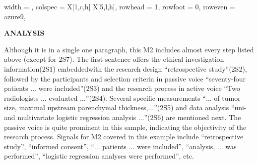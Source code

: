 \documentclass{ctexbook}
\begin{document}
\begin{sample}[label={myautocounter}]{\heiti}
{\begin{longtblr}[
      caption = {Common Prefixes},
      label = {tab:Common_Prefixes},
  ]{
      width = \textwidth,
      colspec = {X[1,c,h]  X[5,l,h]},
      rowhead = 1, rowfoot = 0, %
      row{even} = {azure9},
  }
    \bottomrule

  \end{longtblr}
  }

  \noindent \textbf{ANALYSIS}

  Although it is in a single one paragraph, this M2 includes almost every step listed above (except for 2S7). The first sentence offers the ethical investigation information(2S1) embeddedwith the research design ``retrospective study''(2S2), followed by the participants and selection criteria in passive voice ``seventy-four patients $\dots$ were included''(2S3) and the research process in active voice ``Two radiologists $\dots$ evaluated $\dots$''(2S4). Several specific measurements ``$\dots$ of tumor size, maximal upstream parenchymal thickness,$\dots$''(2S5) and data analysis ``uni-and multivariate logistic regression analysis $\dots$''(2S6) are mentioned next. The passive voice is quite prominent in this sample, indicating the objectivity of the research process. Signals for M2 covered in this example include ``retrospective study'', ``informed consent'', ``$\dots$ patients $\dots$ were included'', ``analysis, $\dots$ was performed'', ``logistic regression analyses were performed'', etc.

\end{sample}
\end{document}
